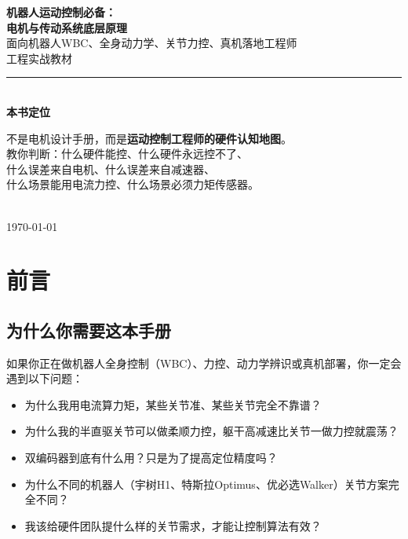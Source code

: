 \begin{titlepage}
\centering
\vspace*{3cm}
{\Huge\bfseries\color{primaryblue} 机器人运动控制必备：\\[15pt]
电机与传动系统底层原理}\\[20pt]
{\Large 面向机器人WBC、全身动力学、关节力控、真机落地工程师}\\[10pt]
{\large 工程实战教材}\\[30pt]

\rule{0.8\textwidth}{1pt}\\[20pt]

{\large\bfseries 本书定位}\\[10pt]
\begin{minipage}{0.85\textwidth}
\centering
不是电机设计手册，而是\textbf{运动控制工程师的硬件认知地图}。\\
教你判断：什么硬件能控、什么硬件永远控不了、\\
什么误差来自电机、什么误差来自减速器、\\
什么场景能用电流力控、什么场景必须力矩传感器。
\end{minipage}\\[30pt]

\vfill
{\large \today}
\end{titlepage}

\tableofcontents
\newpage

\chapter*{前言}

\section*{为什么你需要这本手册}

如果你正在做机器人全身控制（WBC）、力控、动力学辨识或真机部署，你一定会遇到以下问题：

\begin{itemize}
  \item 为什么我用电流算力矩，某些关节准、某些关节完全不靠谱？
  \item 为什么我的半直驱关节可以做柔顺力控，躯干高减速比关节一做力控就震荡？
  \item 双编码器到底有什么用？只是为了提高定位精度吗？
  \item 为什么不同的机器人（宇树H1、特斯拉Optimus、优必选Walker）关节方案完全不同？
  \item 我该给硬件团队提什么样的关节需求，才能让控制算法有效？
\end{itemize}

